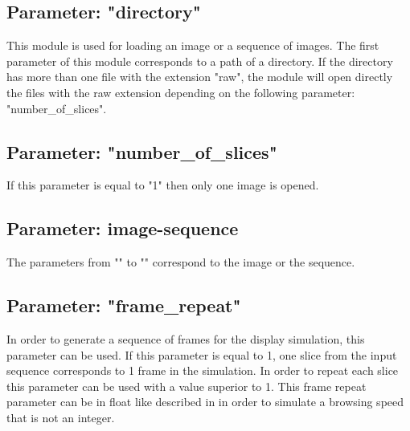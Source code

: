 \subsection{Parameter: "directory"}

This module is used for loading an image or a sequence of images. The first parameter of this module corresponds to a path of a directory. If the directory has more than one file with the extension "raw", the module will open directly the files with the raw extension depending on the following parameter: "number\_of\_slices".

\subsection{Parameter: "number\_of\_slices"}

If this parameter is equal to "1" then only one image is opened.

\subsection{Parameter: image-sequence}

The parameters from "" to "" correspond to the image or the sequence.

\subsection{Parameter: "frame\_repeat"}

In order to generate a sequence of frames for the display simulation, this parameter can be used. If this parameter is equal to 1, one slice from the input sequence corresponds to 1 frame in the simulation. In order to repeat each slice this parameter can be used with a value superior to 1. This frame repeat parameter can be in float like described in \cite{Mar12} in order to simulate a browsing speed that is not an integer.

